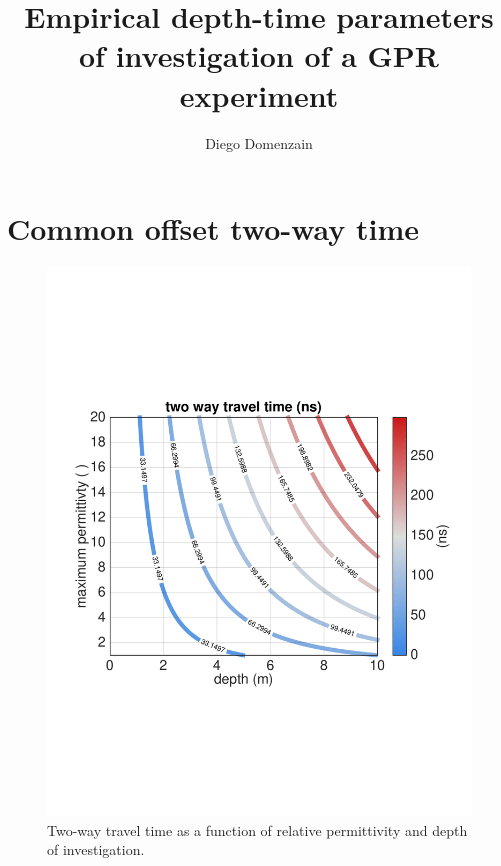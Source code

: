 \documentclass[a4paper,12pt]{article}
\title{Empirical depth-time parameters of investigation of a GPR experiment}
\author{Diego Domenzain}
\date{}
\begin{document}
\maketitle

%
\section{Common offset two-way time}
%
%
\begin{figure}[!h]
\centering
\includegraphics[trim={20 170 30 180},width=\textwidth]{../pics/two-way-time.pdf}
\caption{Two-way travel time as a function of relative permittivity and depth of investigation.}
\label{fig:two-way-time}
\end{figure}
%
\newpage
\end{document}

